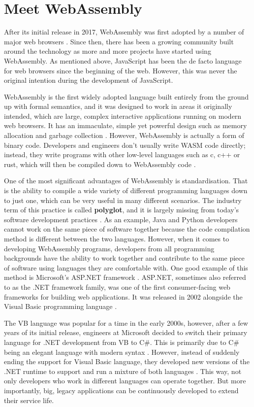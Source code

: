 \bigskip
\section{Meet WebAssembly}

After its initial release in 2017, WebAssembly was first adopted by a number of major web browsers \cite{int17}. Since then, there has been a growing community built around the technology as more and more projects have started using WebAssembly. As mentioned above, JavaScript has been the de facto language for web browsers since the beginning of the web. However, this was never the original intention during the development of JavaScript.

WebAssembly is the first widely adopted language built entirely from the ground up with formal semantics, and it was designed to work in areas it originally intended, which are large, complex interactive applications running on modern web browsers. It has an immaculate, simple yet powerful design such as memory allocation and garbage collection \cite{int18}. However, WebAssembly is actually a form of binary code. Developers and engineers don't usually write WASM code directly; instead, they write programs with other low-level languages such as c, c++ or rust, which will then be compiled down to WebAssembly code \cite{int19}.

One of the most significant advantages of WebAssembly is standardisation. That is the ability to compile a wide variety of different programming languages down to just one, which can be very useful in many different scenarios. The industry term of this practice is called \textbf{polyglot}, and it is largely missing from today's software development practices \cite{int20}. As an example, Java and Python developers cannot work on the same piece of software together because the code compilation method is different between the two languages. However, when it comes to developing WebAssembly programs, developers from all programming backgrounds have the ability to work together and contribute to the same piece of software using languages they are comfortable with. One good example of this method is Microsoft's ASP.NET framework \cite{int21}. ASP.NET, sometimes also referred to as the .NET framework family, was one of the first consumer-facing web frameworks for building web applications. It was released in 2002 alongside the Visual Basic programming language \cite{int22} \cite{int23}.

The VB language was popular for a time in the early 2000s, however, after a few years of its initial release, engineers at Microsoft decided to switch their primary language for .NET development from VB to C\#. This is primarily due to C\# being an elegant language with modern syntax \cite{int24}. However, instead of suddenly ending the support for Visual Basic language, they developed new versions of the .NET runtime to support and run a mixture of both languages \cite{int25}. This way, not only developers who work in different languages can operate together. But more importantly, big, legacy applications can be continuously developed to extend their service life.

